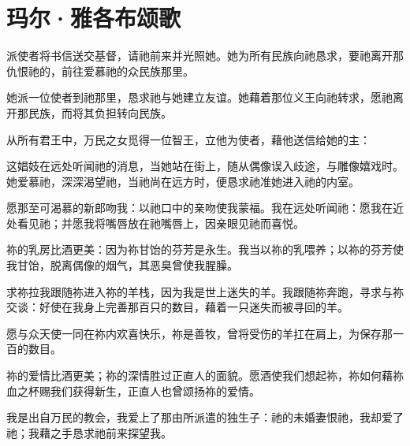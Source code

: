 
\chapter{玛尔·雅各布颂歌}


\par

派使者将书信送交基督，请祂前来并光照她。她为所有民族向祂恳求，要祂离开那仇恨祂的，前往爱慕祂的众民族那里。\par

她派一位使者到祂那里，恳求祂与她建立友谊。她藉着那位义王向祂转求，愿祂离开那民族，而将其负担转向民族。\par

从所有君王中，万民之女觅得一位智王，立他为使者，藉他送信给她的主：\par

这娼妓在远处听闻祂的消息，当她站在街上，随从偶像误入歧途，与雕像嬉戏时。她爱慕祂，深深渴望祂，当祂尚在远方时，便恳求祂准她进入祂的内室。\par

愿那至可渴慕的新郎吻我：以祂口中的亲吻使我蒙福。我在远处听闻祂：愿我在近处看见祂；并愿我将嘴唇放在祂嘴唇上，因亲眼见祂而喜悦。\par

祢的乳房比酒更美：因为祢甘饴的芬芳是永生。我当以祢的乳喂养；以祢的芬芳使我甘饴，脱离偶像的烟气，其恶臭曾使我腥臊。\par

求祢拉我跟随祢进入祢的羊栈，因为我是世上迷失的羊。我跟随祢奔跑，寻求与祢交谈：好使在我身上完善那百只的数目，藉着一只迷失而被寻回的羊。\par

愿与众天使一同在祢内欢喜快乐，祢是善牧，曾将受伤的羊扛在肩上，为保存那一百的数目。\par

祢的爱情比酒更美；祢的深情胜过正直人的面貌。愿酒使我们想起祢，祢如何藉祢血之杯赐我们获得新生，正直人也曾颂扬祢的爱情。\par

我是出自万民的教会，我爱上了那由所派遣的独生子：祂的未婚妻恨祂，我却爱了祂；我藉之手恳求祂前来探望我。\par

